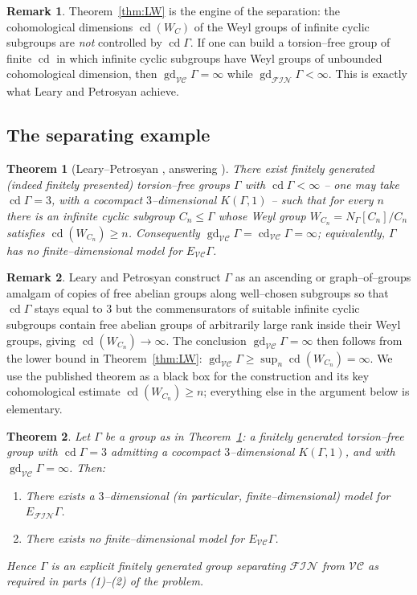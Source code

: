 \documentclass{amsart}
\newtheorem{theorem}{Theorem}
\theoremstyle{definition}
\newtheorem{remark}{Remark}
\newcommand{\FIN}{\mathcal{F\!I\!N}}
\newcommand{\VC}{\mathcal{V\!C}}
\newcommand{\gd}{\operatorname{gd}}
\newcommand{\cd}{\operatorname{cd}}
\begin{document}
\begin{remark}
Theorem~\ref{thm:LW} is the engine of the separation: the cohomological dimensions $\cd(W_C)$
of the Weyl groups of infinite cyclic subgroups are \emph{not} controlled by $\cd\Gamma$. If
one can build a torsion--free group of finite $\cd$ in which infinite cyclic subgroups have
Weyl groups of unbounded cohomological dimension, then $\gd_{\VC}\Gamma=\infty$ while
$\gd_{\FIN}\Gamma<\infty$. This is exactly what Leary and Petrosyan achieve.
\end{remark}

\subsection{The separating example}

\begin{theorem}[Leary--Petrosyan {\cite[Theorem~B]{LearyPetrosyan}}, answering
{\cite{JPL}}]\label{thm:LP}
There exist finitely generated (indeed finitely presented) torsion--free groups $\Gamma$ with
$\cd\Gamma<\infty$ -- one may take $\cd\Gamma=3$, with a cocompact $3$--dimensional
$K(\Gamma,1)$ -- such that for every $n$ there is an infinite cyclic subgroup
$C_n\le\Gamma$ whose Weyl group $W_{C_n}=N_\Gamma[C_n]/C_n$ satisfies $\cd(W_{C_n})\ge n$.
Consequently $\gd_{\VC}\Gamma=\cd_{\VC}\Gamma=\infty$; equivalently, $\Gamma$ has no
finite--dimensional model for $E_{\VC}\Gamma$.
\end{theorem}

\begin{remark}
Leary and Petrosyan construct $\Gamma$ as an ascending or graph--of--groups amalgam of copies
of free abelian groups along well--chosen subgroups so that $\cd\Gamma$ stays equal to $3$ but
the commensurators of suitable infinite cyclic subgroups contain free abelian groups of
arbitrarily large rank inside their Weyl groups, giving $\cd(W_{C_n})\to\infty$. The
conclusion $\gd_{\VC}\Gamma=\infty$ then follows from the lower bound in
Theorem~\ref{thm:LW}: $\gd_{\VC}\Gamma\ge\sup_n\cd(W_{C_n})=\infty$. We use the published
theorem as a black box for the construction and its key cohomological estimate
$\cd(W_{C_n})\ge n$; everything else in the argument below is elementary.
\end{remark}

\begin{theorem}\label{thm:main}
Let $\Gamma$ be a group as in Theorem~\ref{thm:LP}: a finitely generated torsion--free group
with $\cd\Gamma=3$ admitting a cocompact $3$--dimensional $K(\Gamma,1)$, and with
$\gd_{\VC}\Gamma=\infty$. Then:
\begin{enumerate}
\item There exists a $3$--dimensional (in particular, finite--dimensional) model for
$E_{\FIN}\Gamma$.
\item There exists no finite--dimensional model for $E_{\VC}\Gamma$.
\end{enumerate}
Hence $\Gamma$ is an explicit finitely generated group separating $\FIN$ from $\VC$ as
required in parts (1)--(2) of the problem.
\end{theorem}
\end{document}
